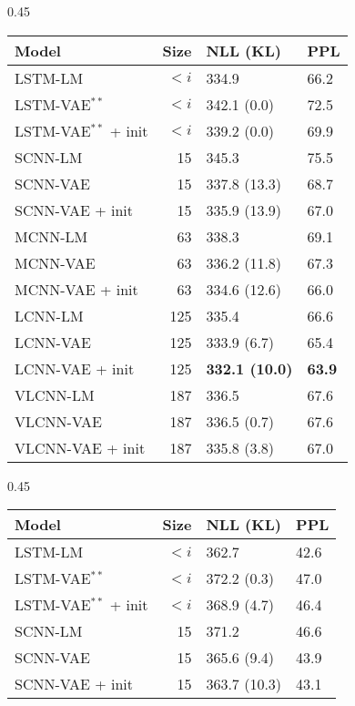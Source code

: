 \documentclass{article}
\begin{document}
\begin{table*}[!th]
  \small
  \centering
  \begin{subtable}{0.45\textwidth}
    \begin{tabular}{l r l l}
      Model & Size & NLL (KL) &  PPL \\
      \toprule
      LSTM-LM & $<i$ & 334.9 & 66.2 \\
      LSTM-VAE$^{**}$  & $<i$  & 342.1 (0.0) & 72.5 \\
      LSTM-VAE$^{**}$ + init & $<i$  & 339.2 (0.0) & 69.9 \\
      \midrule
      SCNN-LM & 15 & 345.3 & 75.5 \\
      SCNN-VAE & 15 & 337.8 (13.3) & 68.7 \\
      SCNN-VAE + init & 15 & 335.9 (13.9) & 67.0 \\
      \midrule
      MCNN-LM & 63 & 338.3 & 69.1 \\
      MCNN-VAE & 63 & 336.2 (11.8) & 67.3 \\
      MCNN-VAE + init & 63 & 334.6 (12.6) & 66.0 \\
      \midrule
      LCNN-LM & 125 & 335.4  & 66.6 \\
      LCNN-VAE & 125  & 333.9 (6.7) & 65.4 \\
      LCNN-VAE + init & 125 & {\bf 332.1 (10.0)} & {\bf 63.9} \\
      \midrule
      VLCNN-LM & 187 & 336.5  & 67.6 \\
      VLCNN-VAE & 187  & 336.5 (0.7) & 67.6 \\
      VLCNN-VAE + init & 187 & 335.8 (3.8) & 67.0 \\
\bottomrule
    \end{tabular}
    \caption{Yahoo}
    \label{tab:yahooppl}
  \end{subtable}
  \qquad
  \begin{subtable}{0.45\textwidth}
    \begin{tabular}{l r l l}
      Model & Size & NLL (KL) &  PPL \\
      \toprule
      LSTM-LM & $<i$ & 362.7 & 42.6 \\
      LSTM-VAE$^{**}$  & $<i$  & 372.2 (0.3) & 47.0 \\
      LSTM-VAE$^{**}$ + init & $<i$  & 368.9 (4.7) & 46.4 \\
      \midrule
      SCNN-LM & 15 & 371.2 & 46.6 \\
      SCNN-VAE & 15 & 365.6 (9.4) & 43.9 \\
      SCNN-VAE + init & 15 & 363.7 (10.3) & 43.1 \\

\end{tabular}
\end{subtable}
\end{table*}
\end{document}
